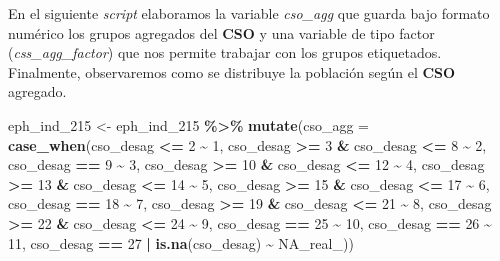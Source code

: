 \documentclass[
]{article}
\newenvironment{Shaded}{\begin{snugshade}}{\end{snugshade}}
\newcommand{\AttributeTok}[1]{\textcolor[rgb]{0.13,0.29,0.53}{#1}}
\newcommand{\ConstantTok}[1]{\textcolor[rgb]{0.56,0.35,0.01}{#1}}
\newcommand{\DecValTok}[1]{\textcolor[rgb]{0.00,0.00,0.81}{#1}}
\newcommand{\FunctionTok}[1]{\textcolor[rgb]{0.13,0.29,0.53}{\textbf{#1}}}
\newcommand{\NormalTok}[1]{#1}
\newcommand{\OtherTok}[1]{\textcolor[rgb]{0.56,0.35,0.01}{#1}}
\newcommand{\SpecialCharTok}[1]{\textcolor[rgb]{0.81,0.36,0.00}{\textbf{#1}}}
\begin{document}
En el siguiente \emph{script} elaboramos la variable \emph{cso\_agg} que guarda bajo formato numérico los grupos agregados del \textbf{CSO} y una variable de tipo factor (\emph{css\_agg\_factor}) que nos permite trabajar con los grupos etiquetados. Finalmente, observaremos como se distribuye la población según el \textbf{CSO} agregado.

\begin{Shaded}
\begin{Highlighting}[]
\NormalTok{eph\_ind\_215 }\OtherTok{\textless{}{-}}\NormalTok{ eph\_ind\_215 }\SpecialCharTok{\%\textgreater{}\%}
    \FunctionTok{mutate}\NormalTok{(}\AttributeTok{cso\_agg =} \FunctionTok{case\_when}\NormalTok{(cso\_desag }\SpecialCharTok{\textless{}=} \DecValTok{2} \SpecialCharTok{\textasciitilde{}} \DecValTok{1}\NormalTok{, cso\_desag }\SpecialCharTok{\textgreater{}=} \DecValTok{3} \SpecialCharTok{\&}\NormalTok{ cso\_desag }\SpecialCharTok{\textless{}=}
        \DecValTok{8} \SpecialCharTok{\textasciitilde{}} \DecValTok{2}\NormalTok{, cso\_desag }\SpecialCharTok{==} \DecValTok{9} \SpecialCharTok{\textasciitilde{}} \DecValTok{3}\NormalTok{, cso\_desag }\SpecialCharTok{\textgreater{}=} \DecValTok{10} \SpecialCharTok{\&}\NormalTok{ cso\_desag }\SpecialCharTok{\textless{}=} \DecValTok{12} \SpecialCharTok{\textasciitilde{}} \DecValTok{4}\NormalTok{, cso\_desag }\SpecialCharTok{\textgreater{}=}
        \DecValTok{13} \SpecialCharTok{\&}\NormalTok{ cso\_desag }\SpecialCharTok{\textless{}=} \DecValTok{14} \SpecialCharTok{\textasciitilde{}} \DecValTok{5}\NormalTok{, cso\_desag }\SpecialCharTok{\textgreater{}=} \DecValTok{15} \SpecialCharTok{\&}\NormalTok{ cso\_desag }\SpecialCharTok{\textless{}=} \DecValTok{17} \SpecialCharTok{\textasciitilde{}} \DecValTok{6}\NormalTok{, cso\_desag }\SpecialCharTok{==}
        \DecValTok{18} \SpecialCharTok{\textasciitilde{}} \DecValTok{7}\NormalTok{, cso\_desag }\SpecialCharTok{\textgreater{}=} \DecValTok{19} \SpecialCharTok{\&}\NormalTok{ cso\_desag }\SpecialCharTok{\textless{}=} \DecValTok{21} \SpecialCharTok{\textasciitilde{}} \DecValTok{8}\NormalTok{, cso\_desag }\SpecialCharTok{\textgreater{}=} \DecValTok{22} \SpecialCharTok{\&}\NormalTok{ cso\_desag }\SpecialCharTok{\textless{}=}
        \DecValTok{24} \SpecialCharTok{\textasciitilde{}} \DecValTok{9}\NormalTok{, cso\_desag }\SpecialCharTok{==} \DecValTok{25} \SpecialCharTok{\textasciitilde{}} \DecValTok{10}\NormalTok{, cso\_desag }\SpecialCharTok{==} \DecValTok{26} \SpecialCharTok{\textasciitilde{}} \DecValTok{11}\NormalTok{, cso\_desag }\SpecialCharTok{==} \DecValTok{27} \SpecialCharTok{|} \FunctionTok{is.na}\NormalTok{(cso\_desag) }\SpecialCharTok{\textasciitilde{}}
        \ConstantTok{NA\_real\_}\NormalTok{))}


\end{Highlighting}
\end{Shaded}
\end{document}
